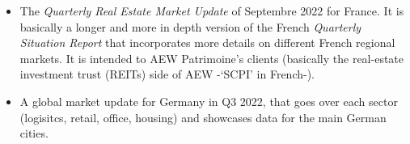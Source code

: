 \begin{itemize}
    \item The \textit{Quarterly Real Estate Market Update} of Septembre 2022 for France. It is basically a longer and more in depth version of the French \textit{Quarterly Situation Report} that incorporates more details on different French regional markets. It is intended to AEW Patrimoine’s clients (basically the real-estate investment trust (REITs) side of AEW -‘SCPI’ in French-).
    \item A global market update for Germany in Q3 2022, that goes over each sector (logisitcs, retail, office, housing) and showcases data for the main German cities. 
\end{itemize}




